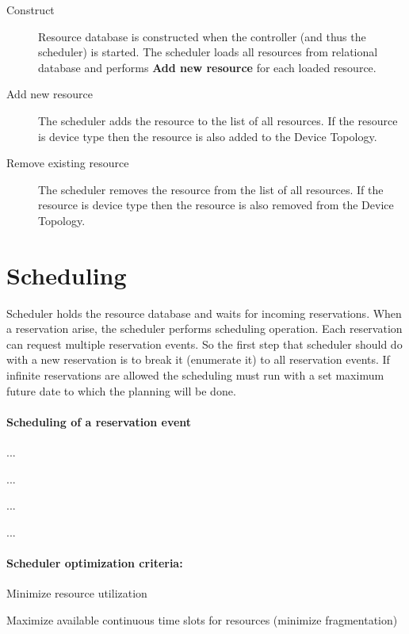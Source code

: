 \begin{description}
\item[Construct]
Resource database is constructed when the controller (and thus the scheduler) 
is started. The scheduler loads all resources from relational database and 
performs \textbf{Add new resource} for each loaded resource.

\item[Add new resource]
The scheduler adds the resource to the list of all resources. If the resource 
is device type then the resource is also added to the Device Topology.

\item[Remove existing resource]
The scheduler removes the resource from the list of all resources. If the 
resource is device type then the resource is also removed from the Device 
Topology.
\end{description}

\section{Scheduling}

Scheduler holds the resource database and waits for incoming reservations. When a reservation arise, the scheduler performs scheduling operation. Each reservation can request multiple reservation events. So the first step that
scheduler should do with a new reservation is to break it (enumerate it) to
all reservation events. If infinite reservations are allowed the scheduling must run with a set maximum future date to which the planning will be done.

\paragraph{Scheduling of a reservation event}
{
\renewcommand{\labelenumi}{\arabic{enumi}.}
\renewcommand{\labelenumii}{\arabic{enumi}.\arabic{enumii}}
\begin{compactenum}
\item ...
  \begin{compactenum}
  \item ...
  \item ...
  \end{compactenum}
\item ...
\end{compactenum}
}


\paragraph{Scheduler optimization criteria:}
\begin{compactitem}
\item Minimize resource utilization
\item Maximize available continuous time slots for resources (minimize 
  fragmentation)
\end{compactitem}
